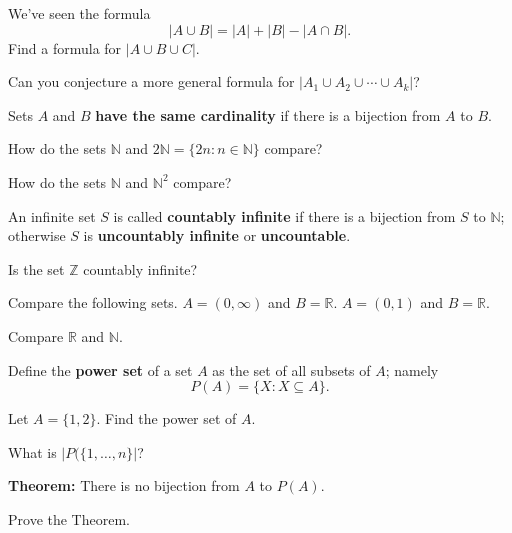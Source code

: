 \documentclass[12pt,letterpaper]{article}
\begin{document}
\begin{enumerate}

\Problem 
We've seen the formula
\begin{equation*}
	|A\cup B| = |A| + |B| - |A\cap B|.
\end{equation*}
Find a formula for $|A\cup B\cup C|$.  

\vfill

\Problem Can you conjecture a more
general formula for $|A_1 \cup A_2 \cup \cdots \cup A_k|$?
\vfill

\newpage

\begin{defn}
Sets $A$ and $B$ {\bf have the same cardinality} if there is a bijection from $A$ to $B$.
\end{defn}

\Problem How do the sets $\mathbb{N}$ and $2\mathbb{N}=\{2n: n\in \mathbb{N} \}$ compare?

\vfill

\Problem How do the sets $\mathbb{N}$ and $\mathbb{N}^2$ compare?

\vfill

\begin{defn}
An infinite set $S$ is called {\bf countably infinite} if there is a bijection from $S$ to $\mathbb{N}$; otherwise $S$ is {\bf uncountably infinite} or {\bf uncountable}.
\end{defn}

\newpage

\Problem Is the set $\mathbb{Z}$ countably infinite?

\vfill

\Problem Compare the following sets.
\Part $A=(0,\infty)$ and $B=\mathbb{R}$.
\vfill
\Part $A=(0,1)$ and $B=\mathbb{R}$.
\vfill

\newpage

\Problem Compare $\mathbb{R}$ and $\mathbb{N}$.

\newpage

\begin{defn}
Define the {\bf power set} of a set $A$ as the set of all subsets of $A$; namely
$$P(A)=\{ X : X \subseteq A\}.$$
\end{defn}

\Problem Let $A=\{1,2\}$. Find the power set of $A$.

\vfill

\Problem What is $|P(\{1, \dots, n\}|$?

\vfill
\vfill
\vfill
\vfill

\newpage

{\bf Theorem:} There is no bijection from $A$ to $P(A)$.

\Problem Prove the Theorem.

\end{enumerate}
\end{document}
